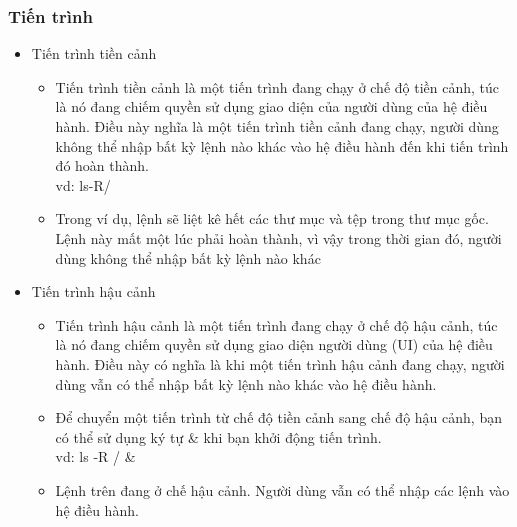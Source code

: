 \documentclass[12pt,a4paper]{article}
\begin{document}
\subsubsection{Tiến trình}
\begin{itemize}
	\item Tiến trình tiền cảnh
	\begin{itemize}
		\item Tiến trình tiền cảnh là một tiến trình đang chạy ở chế độ tiền cảnh, túc là nó đang chiếm quyền sử dụng giao diện của người dùng của hệ điều hành. Điều này nghĩa là một tiến trình tiền cảnh đang chạy, người dùng không thể nhập bất kỳ lệnh nào khác vào hệ điều hành đến khi tiến trình đó hoàn thành.\\
		vd:   ls-R/
		\item Trong ví dụ, lệnh sẽ liệt kê hết các thư mục và tệp trong thư mục gốc. Lệnh này mất một lúc phải hoàn thành, vì vậy trong thời gian đó, người dùng không thể nhập bất kỳ lệnh nào khác
	\end{itemize}
	\item Tiến trình hậu cảnh
	\begin{itemize}
		\item Tiến trình hậu cảnh là một tiến trình đang chạy ở chế độ hậu cảnh, túc là nó đang chiếm quyền sử dụng giao diện người dùng (UI) của hệ điều hành. Điều này có nghĩa là khi một tiến trình hậu cảnh đang chạy, người dùng vẫn có thể nhập bất kỳ lệnh nào khác vào hệ điều hành.
		\item Để chuyển một tiến trình từ chế độ tiền cảnh sang chế độ hậu cảnh, bạn có thể sử dụng ký tự \& khi bạn khởi động tiến trình.\\
		vd: ls -R / \&
		\item Lệnh trên đang ở chế hậu cảnh. Người dùng vẫn có thể nhập các lệnh vào hệ điều hành.
	\end{itemize}
\end{itemize}
\end{document}
